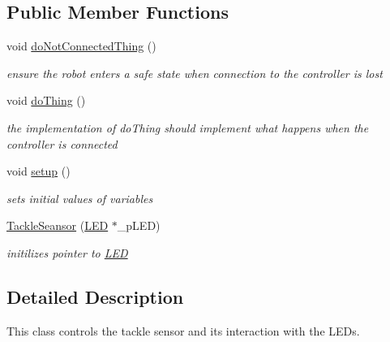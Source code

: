 \subsection*{Public Member Functions}
\begin{DoxyCompactItemize}
\item 
\mbox{\label{class_tackle_seansor_ab545daa8fffd28ecf2c2210ecfeb5e7d}} 
void \mbox{\hyperlink{class_tackle_seansor_ab545daa8fffd28ecf2c2210ecfeb5e7d}{do\+Not\+Connected\+Thing}} ()
\begin{DoxyCompactList}\small\item\em ensure the robot enters a safe state when connection to the controller is lost \end{DoxyCompactList}\item 
\mbox{\label{class_tackle_seansor_a11a7aaec039344fd04ae94cf50545d6c}} 
void \mbox{\hyperlink{class_tackle_seansor_a11a7aaec039344fd04ae94cf50545d6c}{do\+Thing}} ()
\begin{DoxyCompactList}\small\item\em the implementation of do\+Thing should implement what happens when the controller is connected \end{DoxyCompactList}\item 
\mbox{\label{class_tackle_seansor_a36060a6a6e62d3e4077fa29c49724ddc}} 
void \mbox{\hyperlink{class_tackle_seansor_a36060a6a6e62d3e4077fa29c49724ddc}{setup}} ()
\begin{DoxyCompactList}\small\item\em sets initial values of variables \end{DoxyCompactList}\item 
\mbox{\label{class_tackle_seansor_af276afe841ebe04d7073cc802350cbec}} 
\mbox{\hyperlink{class_tackle_seansor_af276afe841ebe04d7073cc802350cbec}{Tackle\+Seansor}} (\mbox{\hyperlink{class_l_e_d}{L\+ED}} $\ast$\+\_\+p\+L\+ED)
\begin{DoxyCompactList}\small\item\em initilizes pointer to \mbox{\hyperlink{class_l_e_d}{L\+ED}} \end{DoxyCompactList}\end{DoxyCompactItemize}


\subsection{Detailed Description}
This class controls the tackle sensor and its interaction with the L\+E\+Ds. 


